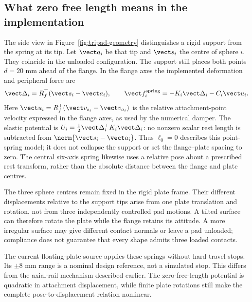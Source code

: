 \subsection{What zero free length means in the implementation}
\label{sec:plate-zero-length}

The side view in Figure~\ref{fig:tripad-geometry} distinguishes a rigid support from the spring at its tip. Let $\vect a_i$ be that tip and $\vect s_i$ the centre of sphere $i$. They coincide in the unloaded configuration. The support still places both points $d=20$ mm ahead of the flange. In the flange axes the implemented deformation and peripheral force are
\begin{equation}
\vect\Delta_i=R_f^\top(\vect s_i-\vect a_i),\qquad
\vect f_i^{\mathrm{spring}}=-K_i\vect\Delta_i-C_i\vect u_i.
\label{eq:plate-point-spring}
\end{equation}
Here $\vect u_i=R_f^\top(\vect v_{s_i}-\vect v_{a_i})$ is the relative attachment-point velocity expressed in the flange axes, as used by the numerical damper. The elastic potential is $U_i=\tfrac12\vect\Delta_i^\top K_i\vect\Delta_i$: no nonzero scalar rest length is subtracted from $\norm{\vect s_i-\vect a_i}$. Thus $\ell_0=0$ describes this point-spring model; it does not collapse the support or set the flange--plate spacing to zero. The central six-axis spring likewise uses a relative pose about a prescribed rest transform, rather than the absolute distance between the flange and plate centres.

The three sphere centres remain fixed in the rigid plate frame. Their different displacements relative to the support tips arise from one plate translation and rotation, not from three independently controlled pad motions. A tilted surface can therefore rotate the plate while the flange retains its attitude. A more irregular surface may give different contact normals or leave a pad unloaded; compliance does not guarantee that every shape admits three loaded contacts.

The current floating-plate source applies these springs without hard travel stops. Its $\pm8$ mm range is a nominal design reference, not a simulated stop. This differs from the axial-rail mechanism described earlier. The zero-free-length potential is quadratic in attachment displacement, while finite plate rotations still make the complete pose-to-displacement relation nonlinear.

